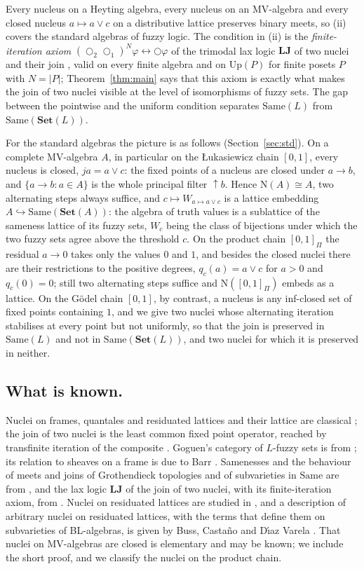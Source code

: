\documentclass[11pt]{amsart}
\theoremstyle{definition}
\newcommand{\Up}{\mathrm{Up}}
\newcommand{\Nuc}{\mathrm{N}}
\newcommand{\Same}{\mathrm{Same}}
\newcommand{\FSet}{\mathbf{Set}}
\newcommand{\LLJ}{\mathbf{LJ}}
\newcommand{\lax}{\bigcirc}
\newcommand{\laxa}{\bigcirc_1}
\newcommand{\laxb}{\bigcirc_2}
\begin{document}
Every nucleus on a Heyting algebra, every nucleus on an MV-algebra and every
closed nucleus $a\mapsto a\vee c$ on a distributive lattice preserves binary
meets, so (ii) covers the standard algebras of fuzzy logic. The condition in
(ii) is the \emph{finite-iteration axiom} $(\laxb\laxa)^N\varphi\leftrightarrow
\lax\varphi$ of the trimodal lax logic $\LLJ$ of two nuclei and their join
\cite{Laxjoin}, valid on every finite algebra and on $\Up(P)$ for finite
posets $P$ with $N=|P|$; Theorem~\ref{thm:main} says that this axiom is
exactly what makes the join of two nuclei visible at the level of
isomorphisms of fuzzy sets. The gap between the pointwise and the uniform
condition separates $\Same(L)$ from $\Same(\FSet(L))$.

For the standard algebras the picture is as follows (Section~\ref{sec:std}).
On a complete MV-algebra $A$, in particular on the \L ukasiewicz chain
$[0,1]$, every nucleus is closed, $ja=a\vee c$: the fixed points of a
nucleus are closed under $a\to b$, and $\{a\to b:a\in A\}$ is the whole
principal filter $\uparrow\!b$. Hence $\Nuc(A)\cong A$, two alternating
steps always suffice, and $c\mapsto W_{a\mapsto a\vee c}$ is a lattice
embedding $A\hookrightarrow\Same(\FSet(A))$: the algebra of truth values is a
sublattice of the sameness lattice of its fuzzy sets, $W_c$ being the class
of bijections under which the two fuzzy sets agree above the threshold $c$.
On the product chain $[0,1]_\Pi$ the residual $a\to0$ takes only the values
$0$ and $1$, and besides the closed nuclei there are their restrictions to
the positive degrees, $q_c(a)=a\vee c$ for $a>0$ and $q_c(0)=0$; still two
alternating steps suffice and $\Nuc([0,1]_\Pi)$ embeds as a lattice. On the G\"odel chain $[0,1]$, by
contrast, a nucleus is any inf-closed set of fixed points containing $1$, and
we give two nuclei whose alternating iteration stabilises at every point but
not uniformly, so that the join is preserved in $\Same(L)$ and not in
$\Same(\FSet(L))$, and two nuclei for which it is preserved in neither.

\subsection*{What is known.}
Nuclei on frames, quantales and residuated lattices and their lattice are
classical \cite{Johnstone,Rosenthal,GJKO}; the join of two nuclei is the
least common fixed point operator, reached by transfinite iteration of the
composite \cite{Macnab,Escardo}. Goguen's category of $L$-fuzzy sets is from
\cite{Goguen}; its relation to sheaves on a frame is due to Barr
\cite{Barr}. Samenesses and the behaviour of meets and joins of Grothendieck
topologies and of subvarieties in $\Same$ are from
\cite{Same,Topjoin,Finitejoin,Varieties}, and the lax logic $\LLJ$ of the
join of two nuclei, with its finite-iteration axiom, from \cite{Laxjoin}.
Nuclei on residuated lattices are studied in \cite{GJKO}, and a
description of arbitrary nuclei on residuated lattices, with the terms that
define them on subvarieties of BL-algebras, is given by Buss, Casta\~no and
D\'\i az Varela \cite{BCD}. That nuclei on MV-algebras are closed is
elementary and may be known; we include the short proof, and we classify
the nuclei on the product chain.
\end{document}
